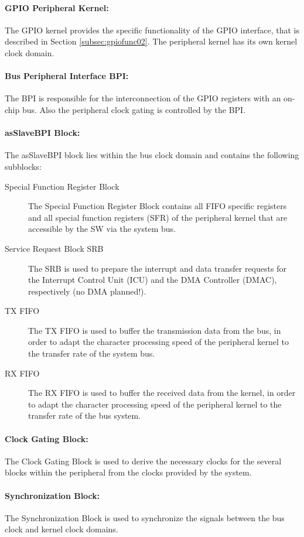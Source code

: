 \paragraph{GPIO Peripheral Kernel: } The GPIO kernel provides the specific functionality of the GPIO interface, that is described in Section \ref{subsec:gpiofunc02}. The peripheral kernel has its own kernel clock domain.

\paragraph{Bus Peripheral Interface BPI: } The BPI is responsible for the interconnection of the GPIO registers with an on-chip bus. Also the peripheral clock gating is controlled by the BPI.

\paragraph{asSlaveBPI Block: } The asSlaveBPI block lies within the bus clock domain and contains the following subblocks:
\begin{description}
  \item [Special Function Register Block] The Special Function Register Block contains all FIFO specific registers and all special function registers (SFR) of the peripheral kernel that are accessible by the SW via the system bus.
  \item [Service Request Block SRB] The SRB is used to prepare the interrupt and data transfer requests for the Interrupt Control Unit (ICU) and the DMA Controller (DMAC), respectively (no DMA planned!).
  \item [TX FIFO] The TX FIFO is used to buffer the transmission data from the bus, in order to adapt the character processing speed of the peripheral kernel to the transfer rate of the system bus.
  \item [RX FIFO] The RX FIFO is used to buffer the received data from the kernel, in order to adapt the character processing speed of the peripheral kernel to the transfer rate of the bus system.
\end{description}

\paragraph{Clock Gating Block: } The Clock Gating Block is used to derive the necessary clocks for the several blocks within the peripheral from the clocks provided by the system.

\paragraph{Synchronization Block: } The Synchronization Block is used to synchronize the signals between the bus clock and kernel clock domains.
